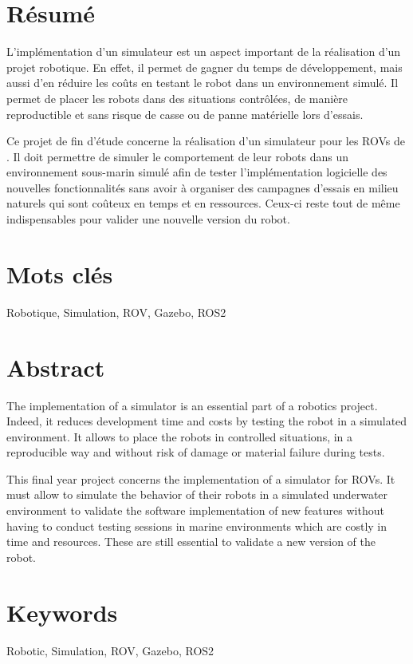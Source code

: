 \section*{Résumé}
	L'implémentation d'un simulateur est un aspect important de la réalisation d'un projet robotique. En effet, il permet de gagner du temps de développement, mais aussi d'en réduire les coûts en testant le robot dans un environnement simulé. Il permet de placer les robots dans des situations contrôlées, de manière reproductible et sans risque de casse ou de panne matérielle lors d'essais.

	Ce projet de fin d'étude concerne la réalisation d'un simulateur pour les \gls{ROV}s de \forssea{}. Il doit permettre de simuler le comportement de leur robots dans un environnement sous-marin simulé afin de tester l'implémentation logicielle des nouvelles fonctionnalités sans avoir à organiser des campagnes d'essais en milieu naturels qui sont coûteux en temps et en ressources. Ceux-ci reste tout de même indispensables pour valider une nouvelle version du robot.

\section*{Mots clés}
Robotique, Simulation, ROV, Gazebo, ROS2

\section*{Abstract}

	The implementation of a simulator is an essential part of a robotics project. Indeed, it reduces development time and costs by testing the robot in a simulated environment. It allows to place the robots in controlled situations, in a reproducible way and without risk of damage or material failure during tests.

	This final year project concerns the implementation of a simulator for \forssea{} \gls{ROV}s. It must allow to simulate the behavior of their robots in a simulated underwater environment to validate the software implementation of new features without having to conduct testing sessions in marine environments which are costly in time and resources. These are still essential to validate a new version of the robot.
	
\section*{Keywords}
Robotic, Simulation, ROV, Gazebo, ROS2

